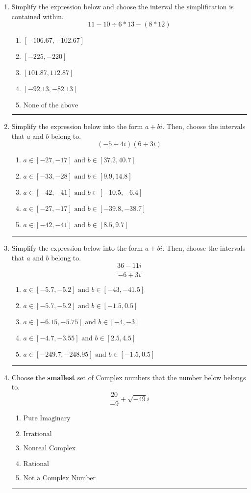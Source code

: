 \documentclass[14pt]{extbook}
\newcommand{\litem}[1]{\item#1\hspace*{-1cm}\rule{\textwidth}{0.4pt}}
\begin{document}
\begin{enumerate}
\litem{
Simplify the expression below and choose the interval the simplification is contained within.\[ 11 - 10 \div 6 * 13 - (8 * 12) \]\begin{enumerate}[label=\Alph*.]
\item \( [-106.67, -102.67] \)
\item \( [-225, -220] \)
\item \( [101.87, 112.87] \)
\item \( [-92.13, -82.13] \)
\item \( \text{None of the above} \)

\end{enumerate} }
\litem{
Simplify the expression below into the form $a+bi$. Then, choose the intervals that $a$ and $b$ belong to.\[ (-5 + 4 i)(6 + 3 i) \]\begin{enumerate}[label=\Alph*.]
\item \( a \in [-27, -17] \text{ and } b \in [37.2, 40.7] \)
\item \( a \in [-33, -28] \text{ and } b \in [9.9, 14.8] \)
\item \( a \in [-42, -41] \text{ and } b \in [-10.5, -6.4] \)
\item \( a \in [-27, -17] \text{ and } b \in [-39.8, -38.7] \)
\item \( a \in [-42, -41] \text{ and } b \in [8.5, 9.7] \)

\end{enumerate} }
\litem{
Simplify the expression below into the form $a+bi$. Then, choose the intervals that $a$ and $b$ belong to.\[ \frac{36 - 11 i}{-6 + 3 i} \]\begin{enumerate}[label=\Alph*.]
\item \( a \in [-5.7, -5.2] \text{ and } b \in [-43, -41.5] \)
\item \( a \in [-5.7, -5.2] \text{ and } b \in [-1.5, 0.5] \)
\item \( a \in [-6.15, -5.75] \text{ and } b \in [-4, -3] \)
\item \( a \in [-4.7, -3.55] \text{ and } b \in [2.5, 4.5] \)
\item \( a \in [-249.7, -248.95] \text{ and } b \in [-1.5, 0.5] \)

\end{enumerate} }
\litem{
Choose the \textbf{smallest} set of Complex numbers that the number below belongs to.\[ \frac{20}{-9}+\sqrt{-49}i \]\begin{enumerate}[label=\Alph*.]
\item \( \text{Pure Imaginary} \)
\item \( \text{Irrational} \)
\item \( \text{Nonreal Complex} \)
\item \( \text{Rational} \)
\item \( \text{Not a Complex Number} \)


\end{enumerate}}
\end{enumerate}
\end{document}
